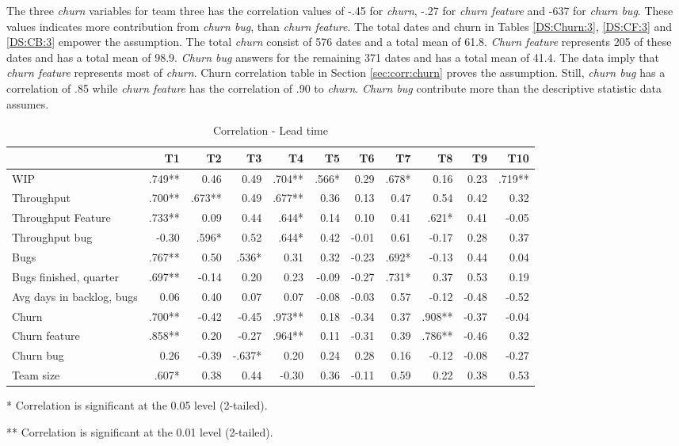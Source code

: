 \documentclass[UKenglish]{ifimaster}  %
\begin{document}
The three \textit{churn} variables for team three has the correlation values of -.45 for \textit{churn}, -.27 for \textit{churn feature} and -637 for \textit{churn bug}. These values indicates more contribution from \textit{churn bug}, than \textit{churn feature}. The total dates and churn in Tables \ref{DS:Churn:3}, \ref{DS:CF:3} and \ref{DS:CB:3} empower the assumption. The total \textit{churn} consist of 576 dates and a total mean of 61.8. \textit{Churn feature}  represents 205 of these dates and has a total mean of 98.9. \textit{Churn bug} answers for the remaining 371 dates and has a total mean of 41.4. The data imply that \textit{churn feature} represents most of \textit{churn}. Churn correlation table in Section \ref{sec:corr:churn} proves the assumption. Still,  \textit{churn bug} has a correlation of .85 while \textit{churn feature} has the correlation of .90 to \textit{churn}. \textit{Churn bug} contribute more than the descriptive statistic data assumes.   

\begin{table}[!htbp]
 \begin{adjustwidth}{-2.5cm}{}
 \centering
 \begin{tabular}{|l|r|r|r|r|r|r|r|r|r|r|}
\hline
 & \bf{T1} & \bf{T2} & \bf{T3} & \bf{T4} & \bf{T5} & \bf{T6} & \bf{T7} & \bf{T8} & \bf{T9} & \bf{T10}\\ \hline
WIP &.749**& 0.46& 0.49& .704**& .566*& 0.29& .678*& 0.16& 0.23& .719**\\ \hline
Throughput &.700**& .673**& 0.49& .677**& 0.36& 0.13& 0.47& 0.54& 0.42& 0.32\\ \hline
Throughput Feature &.733**& 0.09& 0.44& .644*& 0.14& 0.10& 0.41& .621*& 0.41& -0.05\\ \hline
Throughput bug &-0.30& .596*& 0.52& .644*& 0.42& -0.01& 0.61& -0.17& 0.28& 0.37\\ \hline
Bugs &.767**& 0.50& .536*& 0.31& 0.32& -0.23& .692*& -0.13& 0.44& 0.04\\ \hline
Bugs finished, quarter &.697**& -0.14& 0.20& 0.23& -0.09& -0.27& .731*& 0.37& 0.53& 0.19\\ \hline
Avg days in backlog, bugs &0.06& 0.40& 0.07& 0.07& -0.08& -0.03& 0.57& -0.12& -0.48& -0.52\\ \hline
Churn &.700**& -0.42& -0.45& .973**& 0.18& -0.34& 0.37& .908**& -0.37& -0.04\\ \hline
Churn feature &.858**& 0.20& -0.27& .964**& 0.11& -0.31& 0.39& .786**& -0.46& 0.32\\ \hline
Churn bug &0.26& -0.39& -.637*& 0.20& 0.24& 0.28& 0.16& -0.12& -0.08& -0.27\\ \hline
Team size &.607*
& 0.38& 0.44& -0.30& 0.36& -0.11& 0.59& 0.22& 0.38& 0.53\\ \hline
\end{tabular}
 \caption{Correlation - Lead time}
 \label{corr:Lead time}
 \centerline {* Correlation is significant at the 0.05 level (2-tailed).}
\centerline{** Correlation is significant at the 0.01 level (2-tailed).}
\end{adjustwidth}
\end{table}
\newpage
\end{document}
